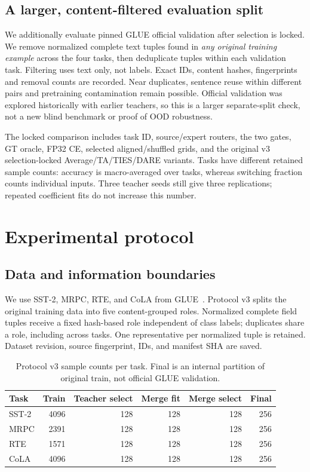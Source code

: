 \documentclass[11pt,a4paper]{article}
\begin{document}
\subsection{A larger, content-filtered evaluation split}
We additionally evaluate pinned GLUE official validation after selection is locked. We remove normalized complete text tuples found in \emph{any original training example} across the four tasks, then deduplicate tuples within each validation task. Filtering uses text only, not labels. Exact IDs, content hashes, fingerprints and removal counts are recorded. Near duplicates, sentence reuse within different pairs and pretraining contamination remain possible. Official validation was explored historically with earlier teachers, so this is a larger separate-split check, not a new blind benchmark or proof of OOD robustness.

The locked comparison includes task ID, source/expert routers, the two gates, GT oracle, FP32 CE, selected aligned/shuffled grids, and the original v3 selection-locked Average/TA/TIES/DARE variants. Tasks have different retained sample counts: accuracy is macro-averaged over tasks, whereas switching fraction counts individual inputs. Three teacher seeds still give three replications; repeated coefficient fits do not increase this number.

\section{Experimental protocol}
\subsection{Data and information boundaries}
We use SST-2, MRPC, RTE, and CoLA from GLUE~\cite{glue}. Protocol v3 splits the original training data into five content-grouped roles. Normalized complete field tuples receive a fixed hash-based role independent of class labels; duplicates share a role, including across tasks. One representative per normalized tuple is retained. Dataset revision, source fingerprint, IDs, and manifest SHA are saved.

\begin{table}[H]\centering\small
\caption{Protocol v3 sample counts per task. Final is an internal partition of original train, not official GLUE validation.}
\begin{tabular}{lrrrrr}\toprule
Task & Train & Teacher select & Merge fit & Merge select & Final\\\midrule
SST-2 &4096&128&128&128&256\\
MRPC &2391&128&128&128&256\\
RTE &1571&128&128&128&256\\
CoLA &4096&128&128&128&256\\\bottomrule
\end{tabular}\end{table}
\end{document}

